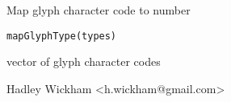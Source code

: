 \begin{Description}\relax
Map glyph character code to number
\end{Description}
\begin{Usage}
\begin{verbatim}mapGlyphType(types)\end{verbatim}
\end{Usage}
\begin{Arguments}
\begin{ldescription}
\item[\code{types}] vector of glyph character codes
\end{ldescription}
\end{Arguments}
\begin{Details}\relax
\end{Details}
\begin{Author}\relax
Hadley Wickham <h.wickham@gmail.com>
\end{Author}
\begin{Examples}
\begin{ExampleCode}\end{ExampleCode}
\end{Examples}

